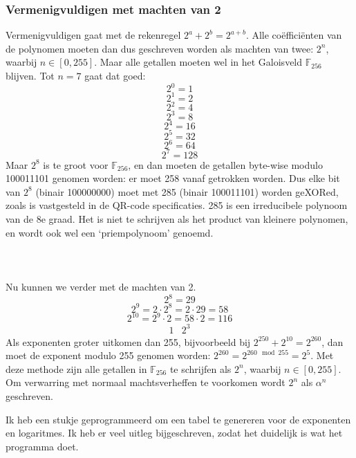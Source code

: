 \documentclass{article}
\begin{document}
\subsubsection*{Vermenigvuldigen met machten van 2}
Vermenigvuldigen gaat met de rekenregel $2^a+2^b=2^{a+b}$. Alle coëfficiënten van de polynomen moeten dan dus geschreven worden als machten van twee: $2^n$, waarbij $n \in [0,255]$. Maar alle getallen moeten wel in het Galoisveld $\mathbb{F}_{256}$ blijven. Tot $n = 7$ gaat dat goed:
$$2^0=1$$
$$2^1=2$$
$$2^2=4$$
$$2^3=8$$
$$2^4=16$$
$$2^5=32$$
$$2^6=64$$
$$2^7=128$$
Maar $2^8$ is te groot voor $\mathbb{F}_{256}$, en dan moeten de getallen byte-wise modulo 100011101 genomen worden: er moet 258 vanaf getrokken worden. Dus elke bit van $2^8$ (binair 100000000) moet met 285 (binair 100011101) worden geXORed, zoals is vastgesteld in de QR-code specificaties. 285 is een irreducibele polynoom van de 8e graad. Het is niet te schrijven als het product van kleinere polynomen, en wordt ook wel een `priempolynoom' genoemd.\\\\
\\\\
Nu kunnen we verder met de machten van 2.
$$2^8 = 29$$
$$2^9 = 2\cdot2^8 = 2\cdot29 = 58$$
$$2^{10} = 2^9 \cdot 2 = 58 \cdot 2 = 116$$
\[
\begin{array}{lll}
1&2^3
\end{array}
\]
Als exponenten groter uitkomen dan 255, bijvoorbeeld bij $2^{250}+2^{10}=2^{260}$, dan moet de exponent modulo 255 genomen worden: $2^{260}=2^{260 \mod{255}}=2^5$. Met deze methode zijn alle getallen in $\mathbb{F}_{256}$ te schrijfen als $2^n$, waarbij $n \in [0,255]$. Om verwarring met normaal machtsverheffen te voorkomen wordt $2^n$ als $\alpha^n$ geschreven. \par
Ik heb een stukje geprogrammeerd om een tabel te genereren voor de exponenten en logaritmes. Ik heb er veel uitleg bijgeschreven, zodat het duidelijk is wat het programma doet.
\end{document}
